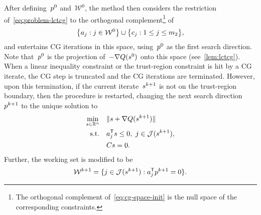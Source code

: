After defining~$\pstep[0]$ and~$\mathcal{W}^0$, the method then considers the restriction of~\cref{eq:problem-lctcg} to the orthogonal complement\footnote{The orthogonal complement of~\cref{eq:cg-space-init} is the null space of the corresponding constraints.} of
\begin{equation}
    \label{eq:cg-space-init}
    \set[\big]{a_j : j \in \mathcal{W}^0} \cup \set[\big]{c_j : 1 \le j \le m_2},
\end{equation}
and entertains CG iterations in this space, using~$\pstep[0]$ as the first search direction.
Note that~$\pstep[0]$ is the projection of~$-\nabla Q(\sstep[0])$ onto this space (see~\cref{lem:lctcg}).
When a linear inequality constraint or the trust-region constraint is hit by a CG iterate, the CG
step is truncated and the CG iterations are terminated.
However, upon this termination, if the current iterate~$\sstep[k + 1]$ is not on the trust-region boundary, then the procedure is restarted, changing the next search direction~$\pstep[k + 1]$ to the unique solution to
\begin{subequations}
    \label{eq:tcg-linear-working-set-after}
    \begin{align}
        \min_{\sstep \in \R^n}  & \quad \norm{\sstep + \nabla Q(\sstep[k + 1])}\\
        \text{s.t.}             & \quad a_j^{\T} \sstep \le 0, ~ j \in \mathcal{J}(\sstep[k + 1]),\\
                                & \quad C \sstep = 0.
    \end{align}
\end{subequations}
Further, the working set is modified to be
\begin{equation}
    \label{eq:tcg-linear-working-set-restart}
    \mathcal{W}^{k + 1} = \set{j \in \mathcal{J}(\sstep[k + 1]) : a_j^{\T} \pstep[k + 1] = 0}.
\end{equation}


